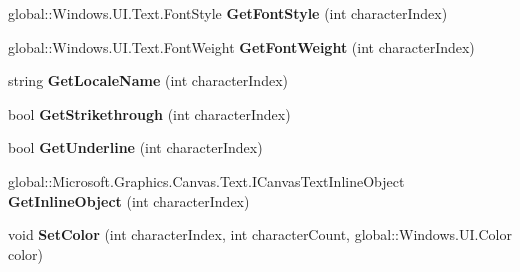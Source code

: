 \begin{DoxyCompactItemize}
\item 
\mbox{\label{class_microsoft_1_1_graphics_1_1_canvas_1_1_text_1_1_canvas_text_layout_a84a97afe4a7b871703795677195da761}} 
global\+::\+Windows.\+U\+I.\+Text.\+Font\+Style {\bfseries Get\+Font\+Style} (int character\+Index)
\item 
\mbox{\label{class_microsoft_1_1_graphics_1_1_canvas_1_1_text_1_1_canvas_text_layout_ad0c1b485da46a633fa7740206bc21f8f}} 
global\+::\+Windows.\+U\+I.\+Text.\+Font\+Weight {\bfseries Get\+Font\+Weight} (int character\+Index)
\item 
\mbox{\label{class_microsoft_1_1_graphics_1_1_canvas_1_1_text_1_1_canvas_text_layout_ad1e03e0c5fae952c5b9c1e2dc0efe6de}} 
string {\bfseries Get\+Locale\+Name} (int character\+Index)
\item 
\mbox{\label{class_microsoft_1_1_graphics_1_1_canvas_1_1_text_1_1_canvas_text_layout_ab63ecf60b01e515ff2edd6dc7d621cb6}} 
bool {\bfseries Get\+Strikethrough} (int character\+Index)
\item 
\mbox{\label{class_microsoft_1_1_graphics_1_1_canvas_1_1_text_1_1_canvas_text_layout_af3519becd05a01693db79181913fc3c2}} 
bool {\bfseries Get\+Underline} (int character\+Index)
\item 
\mbox{\label{class_microsoft_1_1_graphics_1_1_canvas_1_1_text_1_1_canvas_text_layout_a6ff3475276bd3f81526b7bdfe692a997}} 
global\+::\+Microsoft.\+Graphics.\+Canvas.\+Text.\+I\+Canvas\+Text\+Inline\+Object {\bfseries Get\+Inline\+Object} (int character\+Index)
\item 
\mbox{\label{class_microsoft_1_1_graphics_1_1_canvas_1_1_text_1_1_canvas_text_layout_a65a724ca04e36e5f0da7f80d7504de49}} 
void {\bfseries Set\+Color} (int character\+Index, int character\+Count, global\+::\+Windows.\+U\+I.\+Color color)

\end{DoxyCompactItemize}
